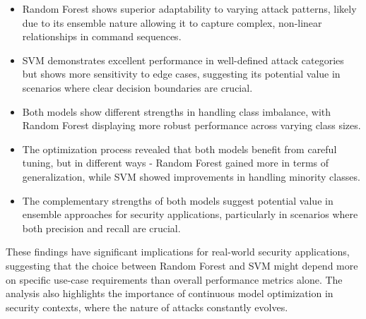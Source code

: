         \begin{itemize}
            \item Random Forest shows superior adaptability to varying attack patterns, likely due to its ensemble nature allowing it to capture complex, non-linear relationships in command sequences.

            \item SVM demonstrates excellent performance in well-defined attack categories but shows more sensitivity to edge cases, suggesting its potential value in scenarios where clear decision boundaries are crucial.

            \item Both models show different strengths in handling class imbalance, with Random Forest displaying more robust performance across varying class sizes.

            \item The optimization process revealed that both models benefit from careful tuning, but in different ways - Random Forest gained more in terms of generalization, while SVM showed improvements in handling minority classes.

            \item The complementary strengths of both models suggest potential value in ensemble approaches for security applications, particularly in scenarios where both precision and recall are crucial.
        \end{itemize}

        These findings have significant implications for real-world security applications, suggesting that the choice between Random Forest and SVM might depend more on specific use-case requirements than overall performance metrics alone. The analysis also highlights the importance of continuous model optimization in security contexts, where the nature of attacks constantly evolves.
        
        
        
        
        \clearpage

        
